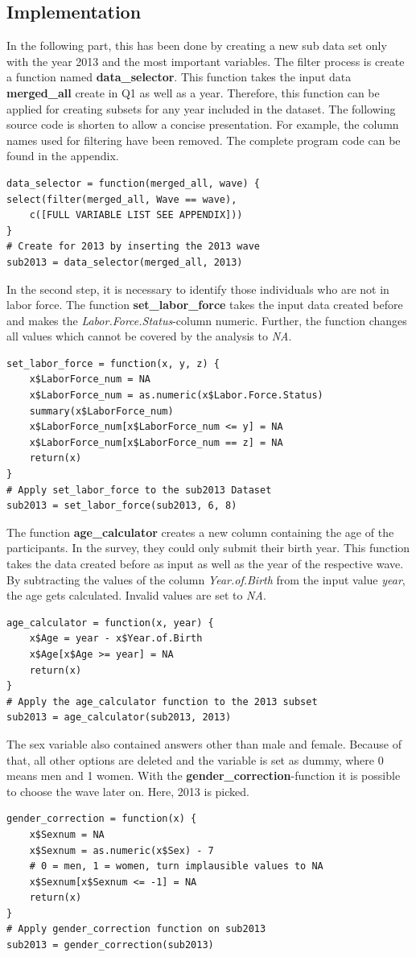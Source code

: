 \documentclass[a4paper]{article}
\begin{document}
\subsection{Implementation}
In the following part, this has been done by creating a new sub data set only with the year 2013 and the most important variables. The filter process is create a function named \textbf{data\_selector}. This function takes the input data \textbf{merged\_all} create in Q1 as well as a year. Therefore, this function can be applied for creating subsets for any year included in the dataset. The following source code is shorten to allow a concise presentation. For example, the column names used for filtering have been removed. The complete program code can be found in the appendix.
\begin{lstlisting}
data_selector = function(merged_all, wave) {
select(filter(merged_all, Wave == wave), 
	c([FULL VARIABLE LIST SEE APPENDIX]))
}
# Create for 2013 by inserting the 2013 wave
sub2013 = data_selector(merged_all, 2013)
\end{lstlisting}
In the second step, it is necessary to identify those individuals who are not in labor force. The function \textbf{set\_labor\_force} takes the input data created before and makes the \textit{Labor.Force.Status}-column numeric. Further, the function changes all values which cannot be covered by the analysis to \textit{NA}.
\begin{lstlisting}
set_labor_force = function(x, y, z) {
    x$LaborForce_num = NA
    x$LaborForce_num = as.numeric(x$Labor.Force.Status)
    summary(x$LaborForce_num)
    x$LaborForce_num[x$LaborForce_num <= y] = NA
    x$LaborForce_num[x$LaborForce_num == z] = NA
    return(x)
}
# Apply set_labor_force to the sub2013 Dataset
sub2013 = set_labor_force(sub2013, 6, 8)
\end{lstlisting}
The function \textbf{age\_calculator} creates a new column containing the age of the participants. In the survey, they could only submit their birth year. This function takes the data created before as input as well as the year of the respective wave. By subtracting the values of the column \textit{Year.of.Birth} from the input value \textit{year}, the age gets calculated. Invalid values are set to \textit{NA}.
\begin{lstlisting}
age_calculator = function(x, year) {
    x$Age = year - x$Year.of.Birth
    x$Age[x$Age >= year] = NA
    return(x)
}
# Apply the age_calculator function to the 2013 subset
sub2013 = age_calculator(sub2013, 2013)
\end{lstlisting}
The sex variable also contained answers other than male and female. Because of that, all other options are deleted and the variable is set as dummy, where 0 means men and 1 women. With the \textbf{gender\_correction}-function it is possible to choose the wave later on. Here, 2013 is picked. 
\begin{lstlisting}
gender_correction = function(x) {
    x$Sexnum = NA
    x$Sexnum = as.numeric(x$Sex) - 7
    # 0 = men, 1 = women, turn implausible values to NA
    x$Sexnum[x$Sexnum <= -1] = NA
    return(x)
}
# Apply gender_correction function on sub2013
sub2013 = gender_correction(sub2013)
\end{lstlisting}
\end{document}

